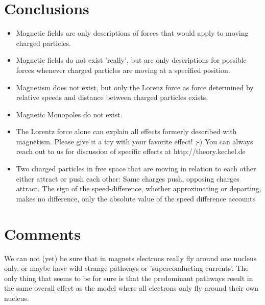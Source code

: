 \documentclass[12pt,a4paper,twocolumn]{article}
\begin{document}
\section{Conclusions}
\begin{itemize}
  \item Magnetic fields are only descriptions of forces that would apply to moving charged particles.
  \item Magnetic fields do not exist 'really', but are only descriptions for possible forces whenever charged particles are moving at a specified position.
  \item Magnetism does not exist, but only the Lorenz force as force determined by relative speeds and distance between charged particles exists.
  \item Magnetic Monopoles do not exist.
  \item The Lorentz force alone can explain all effects formerly described with magnetism. Please give it a try with your favorite effect! ;-) You can always reach out to us for discussion of specific effects at http://theory.kechel.de
  \item Two charged particles in free space that are moving in relation to each other either attract or push each other: Same charges push, opposing charges attract. The sign of the speed-difference, whether approximating or departing, makes no difference, only the absolute value of the speed difference accounts
\end{itemize}

\section{Comments}
We can not (yet) be sure that in magnets electrons really fly around one nucleus only, or maybe have wild strange pathways or 'superconducting currents'. The only thing that seems to be for sure is that the predominant pathways result in the same overall effect as the model where all electrons only fly around their own nucleus.
\end{document}
